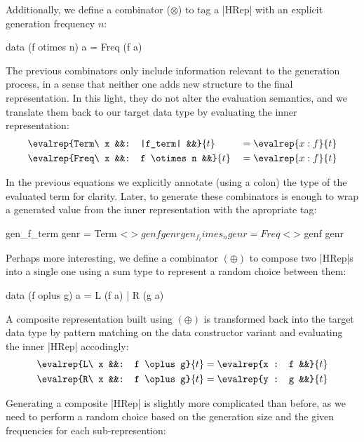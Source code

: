 Additionally, we define a combinator ($\otimes$) to tag a |HRep| with an
explicit generation frequency $n$:

\begin{code}
data (f otimes n) a = Freq (f a)
\end{code}

The previous combinators only include information relevant to the generation
process, in a sense that neither one adds new structure to the final
representation.
%
In this light, they do not alter the evaluation semantics, and we translate them
back to our target data type by evaluating the inner representation:
%
\begin{alignat*}{4}
  &\evalrep{Term\ x &&: |f_term|    &&}{t} &&= \evalrep{x : f}{t} \\
  &\evalrep{Freq\ x &&: f \otimes n &&}{t} &&= \evalrep{x : f}{t}
\end{alignat*}

In the previous equations we explicitly annotate (using a colon) the type of the
evaluated term for clarity.
%
Later, to generate these combinators is enough to wrap a generated value from
the inner representation with the apropriate tag:

\begin{code}
gen_f_term     genr  = Term  <$> genf genr

gen_f_times_n  genr  = Freq  <$> genf genr
\end{code}


Perhaps more interesting, we define a combinator $(\oplus)$ to compose two
|HRep|s into a single one using a sum type to represent a random choice between
them:

\begin{code}
data (f oplus g) a = L (f a) | R (g a)
\end{code}

A composite representation built using $(\oplus)$ is transformed back into the
target data type by pattern matching on the data constructor variant and
evaluating the inner |HRep| accodingly:
%
\begin{alignat*}{3}
  &\evalrep{L\ x &&: f \oplus g}{t} = \evalrep{x : f &&}{t} \\
  &\evalrep{R\ x &&: f \oplus g}{t} = \evalrep{y : g &&}{t}
\end{alignat*}

Generating a composite |HRep| is slightly more complicated than before, as we
need to perform a random choice based on the generation size and the given
frequencies for each sub-represention:

